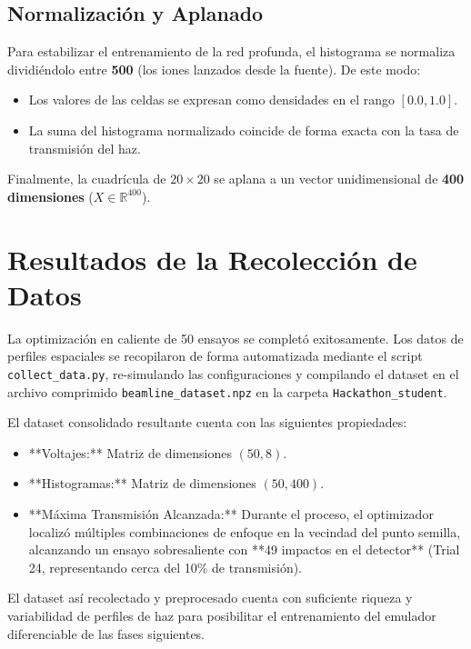 \documentclass[12pt,letterpaper]{article}
\begin{document}
\subsection{Normalización y Aplanado}
Para estabilizar el entrenamiento de la red profunda, el histograma se normaliza dividiéndolo entre \textbf{500} (los iones lanzados desde la fuente). De este modo:
\begin{itemize}
    \item Los valores de las celdas se expresan como densidades en el rango $[0.0, 1.0]$.
    \item La suma del histograma normalizado coincide de forma exacta con la tasa de transmisión del haz.
\end{itemize}
Finalmente, la cuadrícula de $20 \times 20$ se aplana a un vector unidimensional de \textbf{400 dimensiones} ($X \in \mathbb{R}^{400}$).

\section{Resultados de la Recolección de Datos}
La optimización en caliente de 50 ensayos se completó exitosamente. Los datos de perfiles espaciales se recopilaron de forma automatizada mediante el script \texttt{collect\_data.py}, re-simulando las configuraciones y compilando el dataset en el archivo comprimido \texttt{beamline\_dataset.npz} en la carpeta \texttt{Hackathon\_student}.

El dataset consolidado resultante cuenta con las siguientes propiedades:
\begin{itemize}
    \item **Voltajes:** Matriz de dimensiones $(50, 8)$.
    \item **Histogramas:** Matriz de dimensiones $(50, 400)$.
    \item **Máxima Transmisión Alcanzada:** Durante el proceso, el optimizador localizó múltiples combinaciones de enfoque en la vecindad del punto semilla, alcanzando un ensayo sobresaliente con **49 impactos en el detector** (Trial 24, representando cerca del 10\% de transmisión).
\end{itemize}

El dataset así recolectado y preprocesado cuenta con suficiente riqueza y variabilidad de perfiles de haz para posibilitar el entrenamiento del emulador diferenciable de las fases siguientes.
\end{document}
